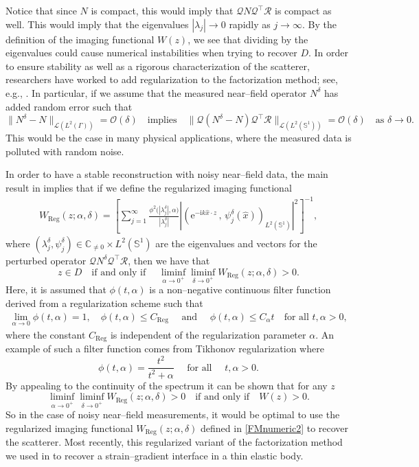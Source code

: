 \documentclass{article}
\newcommand{\C}{\mathbb{C}}
\numberwithin{equation}{section}
\begin{document}
Notice that since $N$ is compact, this would imply that $\mathcal{Q} N \mathcal{Q}^\top \mathcal{R}$ is compact as well. This would imply that the eigenvalues $|\lambda_j| \to 0$ rapidly as $j \to \infty$. By the definition of the imaging functional $W(z)$, we see that dividing by the eigenvalues could cause numerical instabilities when trying to recover $D$. In order to ensure stability as well as a rigorous characterization of the scatterer, researchers have worked to add regularization to the factorization method; see, e.g., \cite{GLSM,regfm2,RegFM}. In particular, if we assume that the measured near--field operator $N^\delta$ has added random error such that 
$$ \| N^\delta - N \|_{\mathcal{L}( L^2(\Gamma))} = \mathcal{O}(\delta) \quad \text{implies} \quad  \|\mathcal{Q}  (N^\delta - N)\mathcal{Q}^\top \mathcal{R} \|_{\mathcal{L}( L^2(\mathbb{S}^1) )} = \mathcal{O}(\delta)  \quad \text{as $\delta \to 0$.}$$ 
This would be the case in many physical applications, where the measured data is polluted with random noise. 

In order to have a stable reconstruction with noisy near--field data, the main result in \cite{regfm2} implies that if we define the regularized imaging functional 
\begin{align} \label{FMnumeric2}
W_{\text{Reg}}(z;\alpha,\delta) = \left[\sum\limits_{j=1}^{\infty}  \frac{ \phi^2 \big(|\lambda^\delta_j| , \alpha \big)}{|\lambda^\delta_j| } \left|\left( \mathrm{e}^{-\mathrm{i}k\hat{x}\cdot z} \, , \, \psi^\delta_j(\hat{x}) \right)_{L^2(\mathbb{S}^1)} \right|^2 \right]^{-1} ,
\end{align}
where $(\lambda^\delta_j , \psi^\delta_j) \in \C_{\neq 0} \times L^2(\mathbb{S}^1)$ are the eigenvalues and vectors for the perturbed operator $\mathcal{Q} N^\delta \mathcal{Q}^\top \mathcal{R}$, then we have that 
$$z \in D \quad \text{if and only if } \quad \liminf\limits_{\alpha \to 0^+}\liminf\limits_{\delta \to 0^+} W_{\text{Reg}}(z;\alpha,\delta)>0.$$
Here, it is assumed that $\phi (t, \alpha ) $ is a non--negative continuous filter function derived from a regularization scheme such that 
\begin{align} \label{filter-assumptions}
\lim\limits_{\alpha \to 0} \phi(t, \alpha ) = 1, \quad \phi(t , \alpha ) \leq C_{\text{Reg}}  \quad \text{ and } \quad  \phi(t, \alpha ) \leq C_{\alpha} t \quad \text{for all} \,\, t, \alpha>0,
\end{align}
where the constant $C_{\text{Reg}}$ is independent of the regularization parameter $\alpha$. 
An example of such a filter function comes from Tikhonov regularization where 
$$\phi (t, \alpha ) =  \frac{t^2}{t^2+\alpha} \quad \text{ for all } \quad t,\alpha>0.$$ 
By appealing to the continuity of the spectrum it can be shown that for any $z$ 
$$\liminf\limits_{\alpha \to 0^+}\liminf\limits_{\delta \to 0^+} W_{\text{Reg}}(z;\alpha,\delta) >0  \quad \text{if and only if} \quad W(z)>0 .$$ 
So in the case of noisy near--field measurements, it would be optimal to use the regularized imaging functional $W_{\text{Reg}}(z;\alpha,\delta)$ defined in \eqref{FMnumeric2} to recover the scatterer. Most recently, this regularized variant of the factorization method we used in \cite{GMR} to recover a strain--gradient interface in a thin elastic body. 
\end{document}
